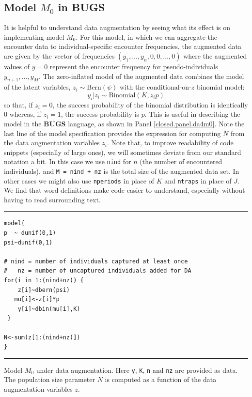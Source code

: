 \subsection{Model $M_0$ in BUGS}

It is helpful to understand data augmentation by seeing what its
effect is on implementing model $M_0$. For this model, 
 in which we can aggregate the encounter data to
individual-specific encounter frequencies, the augmented data are
given by the vector of frequencies $(y_{1}, \ldots, y_{n}, 0, 0,
\ldots, 0)$ where the augmented values of $y=0$ represent the encounter
frequency  for pseudo-individuals $y_{n+1},\ldots,y_{M}$.
The zero-inflated model of the augmented data combines
the model of the latent variables, $z_{i} \sim \mbox{Bern}(\psi)$ with
the conditional-on-$z$ binomial model:
\[
y_{i}|z_{i}   \sim \mbox{Binomial}(K,z_{i} p)
\]
so that, if $z_{i}=0$, the success probability of the binomial
distribution is identically 0 whereas, if $z_{i}=1$, the success
probability is $p$. This is useful in describing the model in the {\bf
  BUGS} language, as shown in Panel \ref{closed.panel.da4m0}.
 Note the last line of the model
specification  provides the expression for computing $N$ from the
data augmentation variables $z_{i}$. Note that, to improve readability of code
snippets (especially of large ones), we will sometimes deviate from our
standard notation a bit. In this case we use \mbox{\tt nind} for $n$
(the number of encountered individuals), and \mbox{\tt M = nind + nz}
is the total size of the augmented data set. In other cases we might
also use \mbox{\tt nperiods} in place of $K$ and \mbox{\tt ntraps} in
place of $J$. We find that word definitions make code easier to
understand, especially without having to read surrounding text.

\begin{panel}[ht]
\centering
\rule[0.15in]{\textwidth}{.03in}
{\small
\begin{verbatim}
model{
p  ~ dunif(0,1)
psi~dunif(0,1)

# nind = number of individuals captured at least once
#   nz = number of uncaptured individuals added for DA
for(i in 1:(nind+nz)) {
    z[i]~dbern(psi)
   mu[i]<-z[i]*p
    y[i]~dbin(mu[i],K)
 }

N<-sum(z[1:(nind+nz)])
}
\end{verbatim}
}
\rule[-0.15in]{\textwidth}{.03in}
\caption{Model $M_{0}$ under data augmentation. Here \mbox{\tt y},
  \mbox{\tt K}, \mbox{\tt n} and \mbox{\tt nz} are provided as
  data. The population size parameter $N$ is computed as a function of
the data augmentation variables $z$. }
\label{closed.panel.da4m0}
\end{panel}





